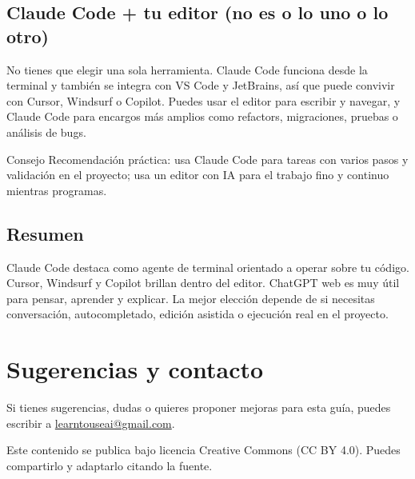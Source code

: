 \documentclass[11pt,a4paper]{report}
\begin{document}
\section{Claude Code + tu editor (no es o lo uno o lo otro)}

No tienes que elegir una sola herramienta. Claude Code funciona desde la terminal y también se integra con VS Code y JetBrains, así que puede convivir con Cursor, Windsurf o Copilot. Puedes usar el editor para escribir y navegar, y Claude Code para encargos más amplios como refactors, migraciones, pruebas o análisis de bugs.

\begin{calloutbox}{Consejo}
Recomendación práctica: usa Claude Code para tareas con varios pasos y validación en el proyecto; usa un editor con IA para el trabajo fino y continuo mientras programas.\end{calloutbox}

\section{Resumen}

Claude Code destaca como agente de terminal orientado a operar sobre tu código. Cursor, Windsurf y Copilot brillan dentro del editor. ChatGPT web es muy útil para pensar, aprender y explicar. La mejor elección depende de si necesitas conversación, autocompletado, edición asistida o ejecución real en el proyecto.

\chapter{Sugerencias y contacto}

Si tienes sugerencias, dudas o quieres proponer mejoras para esta guía, puedes escribir a \mbox{\href{mailto:learntouseai@gmail.com}{learntouseai@gmail.com}}.

Este contenido se publica bajo licencia Creative Commons (CC BY 4.0). Puedes compartirlo y adaptarlo citando la fuente.
\end{document}
